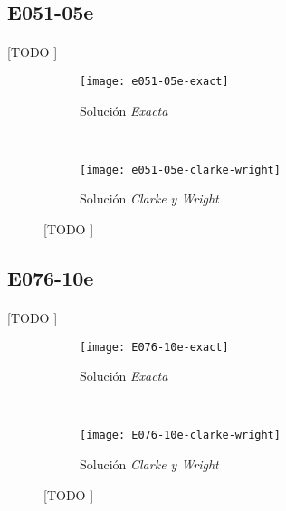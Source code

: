 \documentclass[spanish]{article}
\begin{document}
		\subsection{E051-05e}

			\paragraph{}
			[TODO ]

			\begin{figure}[h]
				\centering
				\begin{subfigure}{.4\textwidth}
					\centering
					\texttt{[image: e051-05e-exact]}
					\caption{Solución \emph{Exacta}}
				\end{subfigure} \
				\begin{subfigure}{.4\textwidth}
					\centering
					\texttt{[image: e051-05e-clarke-wright]}
					\caption{Solución \emph{Clarke y Wright}}
				\end{subfigure}
				\caption{[TODO ]}
				\label{fig:sol-e051-05e}
			\end{figure}

		\subsection{E076-10e}

			\paragraph{}
			[TODO ]

			\begin{figure}[h]
				\centering
				\begin{subfigure}{.4\textwidth}
					\centering
					\texttt{[image: E076-10e-exact]}
					\caption{Solución \emph{Exacta}}
				\end{subfigure} \
				\begin{subfigure}{.4\textwidth}
					\centering
					\texttt{[image: E076-10e-clarke-wright]}
					\caption{Solución \emph{Clarke y Wright}}
				\end{subfigure}
				\caption{[TODO ]}
				\label{fig:sol-e076-10e}
			\end{figure}
	\nocite{subject:mio}
	\nocite{garciparedes:mosel-examples}
	
  
\end{document}

